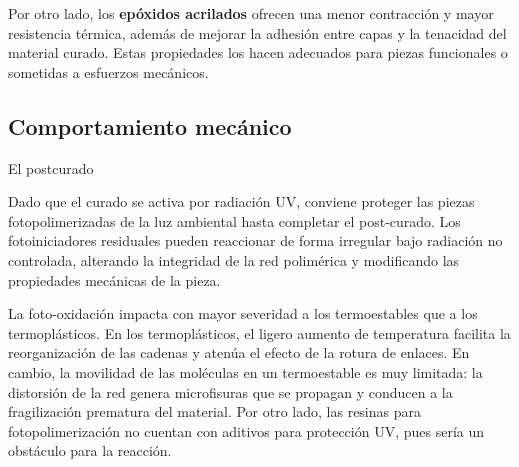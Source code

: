 Por otro lado, los \textbf{epóxidos acrilados} ofrecen una menor contracción y mayor resistencia térmica, además de mejorar la adhesión entre capas y la tenacidad del material curado. Estas propiedades los hacen adecuados para piezas funcionales o sometidas a esfuerzos mecánicos. 

\subsection{Comportamiento mecánico}

El postcurado

Dado que el curado se activa por radiación UV, conviene proteger las piezas fotopolimerizadas de la luz ambiental hasta completar el post-curado. Los fotoiniciadores residuales pueden reaccionar de forma irregular bajo radiación no controlada, alterando la integridad de la red polimérica y modificando las propiedades mecánicas de la pieza.

La foto-oxidación impacta con mayor severidad a los termoestables que a los termoplásticos. En los termoplásticos, el ligero aumento de temperatura facilita la reorganización de las cadenas y atenúa el efecto de la rotura de enlaces. En cambio, la movilidad de las moléculas en un termoestable es muy limitada: la distorsión de la red genera microfisuras que se propagan y conducen a la fragilización prematura del material. Por otro lado, las resinas para fotopolimerización no cuentan con aditivos para protección UV, pues sería un obstáculo para la reacción. 


